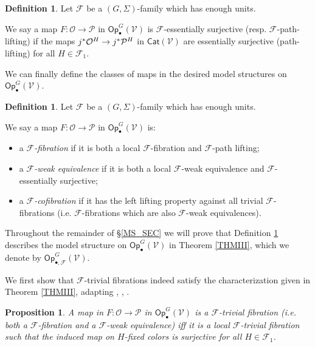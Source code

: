 \documentclass[a4paper,10pt
,draft
]{article}%
\numberwithin{equation}{section}
\numberwithin{figure}{section}
\newtheorem{proposition}[equation]{Proposition}%
\theoremstyle{definition} %
\newtheorem{definition}[equation]{Definition}%
\newcommand{\F}{\ensuremath{\mathcal F}}
\newcommand{\V}{\ensuremath{\mathcal V}}
\renewcommand{\O}{\ensuremath{\mathcal O}}
\renewcommand{\P}{\ensuremath{\mathcal P}}
\newcommand{\1}{\ensuremath{\mathbbm 1}}%
\begin{document}
\begin{definition}\label{FESSENSURJ DEF}
Let $\F$ be a $(G, \Sigma)$-family which has enough units.

We say a map $F: \O \to \P$ in $\mathsf{Op}^G_\bullet(\V)$
is $\F$-essentially surjective (resp. $\F$-path-lifting)
if the maps
$j^{\**}\O^H \to j^{\**} \P^H$
in $\mathsf{Cat}(\V)$ are essentially surjective (path-lifting) for all $H \in \F_1$.
\end{definition}



We can finally define the classes of maps in the desired model structures on $\mathsf{Op}^G_\bullet(\V)$.



\begin{definition}\label{MODEL_DEFN}
Let $\F$ be a $(G, \Sigma)$-family which has enough units.

We say a map $F: \O \to \P$ in $\mathsf{Op}^G_\bullet(\V)$ is:
\begin{itemize}
	\item a {\em $\F$-fibration} if it is both a local $\F$-fibration and $\F$-path lifting;
	\item a {\em $\F$-weak equivalence} if it is both a local $\F$-weak equivalence and $\F$-essentially surjective;
	\item a \textit{$\F$-cofibration} if it has the left lifting property against all trivial $\F$-fibrations (i.e. $\F$-fibrations which are also $\F$-weak equivalences).
\end{itemize}
\end{definition}


Throughout the remainder of \S \ref{MS_SEC}
we will prove that 
Definition \ref{MODEL_DEFN} describes the model structure on 
$\mathsf{Op}^G_\bullet(\V)$
in Theorem \ref{THMIII},
which we denote by
$\mathsf{Op}^G_{\bullet, \F}(\V)$.



We first show that $\F$-trivial fibrations
indeed satisfy the characterization given in Theorem \ref{THMIII},
adapting \cite[4.8]{Cav}, \cite[2.3]{BM13}, \cite[1.18]{CM13b}.

\begin{proposition}\label{FTRIVCHAR PROP}
A map in $F: \O \to \P$ in $\mathsf{Op}^G_\bullet(\V)$ is 
a $\F$-trivial fibration (i.e. both a $\F$-fibration and a $\F$-weak equivalence) 
iff it is a local $\F$-trivial fibration
such that the induced map on $H$-fixed colors is surjective
for all $H \in \F_1$.
\end{proposition}
\end{document}
